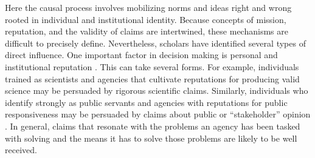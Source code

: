 

Here the causal process involves mobilizing norms and ideas right and wrong rooted in individual and institutional identity. Because concepts of mission, reputation, and the validity of claims are intertwined, these mechanisms are difficult to precisely define. Nevertheless, scholars have identified several types of direct influence. One important factor in decision making is personal and institutional reputation \citep{Carpenter2001}. This can take several forms. For example, individuals trained as scientists and agencies that cultivate reputations for producing valid science may be persuaded by rigorous scientific claims. Similarly, individuals who identify strongly as public servants and agencies with reputations for public responsiveness may be persuaded by claims about public or ``stakeholder'' opinion \citep{Meier2006}. In general, claims that resonate with the problems an agency has been tasked with solving and the means it has to solve those problems are likely to be well received. 







